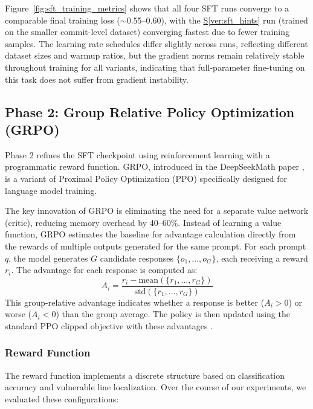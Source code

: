 \documentclass[12pt,a4paper]{article}
\begin{document}
Figure~\ref{fig:sft_training_metrics} shows that all four SFT runs converge to a comparable final training loss ($\sim$0.55--0.60), with the \hyperref[ver:sft_hints]{S\ref*{ver:sft_hints}} run (trained on the smaller commit-level dataset) converging fastest due to fewer training samples. The learning rate schedules differ slightly across runs, reflecting different dataset sizes and warmup ratios, but the gradient norms remain relatively stable throughout training for all variants, indicating that full-parameter fine-tuning on this task does not suffer from gradient instability.

\subsection{Phase 2: Group Relative Policy Optimization (GRPO)}
Phase 2 refines the SFT checkpoint using reinforcement learning with a programmatic reward function. GRPO, introduced in the DeepSeekMath paper \cite{deepseekmath}, is a variant of Proximal Policy Optimization (PPO) specifically designed for language model training.

The key innovation of GRPO is eliminating the need for a separate value network (critic), reducing memory overhead by 40--60\%. Instead of learning a value function, GRPO estimates the baseline for advantage calculation directly from the rewards of multiple outputs generated for the same prompt. For each prompt $q$, the model generates $G$ candidate responses $\{o_1, ..., o_G\}$, each receiving a reward $r_i$. The advantage for each response is computed as:
\begin{equation}
A_i = \frac{r_i - \text{mean}(\{r_1, ..., r_G\})}{\text{std}(\{r_1, ..., r_G\})}
\end{equation}
This group-relative advantage indicates whether a response is better ($A_i > 0$) or worse ($A_i < 0$) than the group average. The policy is then updated using the standard PPO clipped objective with these advantages \cite{deepseekmath, trl}.

\subsubsection{Reward Function}
The reward function implements a discrete structure based on classification accuracy and vulnerable line localization. Over the course of our experiments, we evaluated these configurations:
\end{document}
